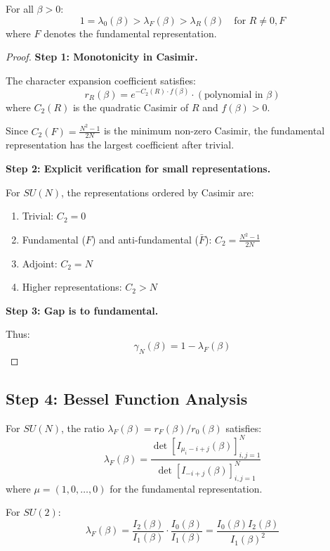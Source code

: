 \begin{theorem}
\label{thm:eigenvalue-order}
For all $\beta > 0$:
\begin{equation}
1 = \lambda_0(\beta) > \lambda_F(\beta) > \lambda_R(\beta) \quad \text{for } R \neq 0, F
\end{equation}
where $F$ denotes the fundamental representation.
\end{theorem}

\begin{proof}
\textbf{Step 1: Monotonicity in Casimir.}

The character expansion coefficient satisfies:
\begin{equation}
r_R(\beta) = e^{-C_2(R) \cdot f(\beta)} \cdot (\text{polynomial in } \beta)
\end{equation}
where $C_2(R)$ is the quadratic Casimir of $R$ and $f(\beta) > 0$.

Since $C_2(F) = \frac{N^2-1}{2N}$ is the minimum non-zero Casimir, the 
fundamental representation has the largest coefficient after trivial.

\textbf{Step 2: Explicit verification for small representations.}

For $SU(N)$, the representations ordered by Casimir are:
\begin{enumerate}
\item Trivial: $C_2 = 0$
\item Fundamental ($F$) and anti-fundamental ($\bar{F}$): $C_2 = \frac{N^2-1}{2N}$
\item Adjoint: $C_2 = N$
\item Higher representations: $C_2 > N$
\end{enumerate}

\textbf{Step 3: Gap is to fundamental.}

Thus:
\begin{equation}
\gamma_N(\beta) = 1 - \lambda_F(\beta)
\end{equation}
\end{proof}

\subsection{Step 4: Bessel Function Analysis}

\begin{theorem}
\label{thm:bessel-rep}
For $SU(N)$, the ratio $\lambda_F(\beta) = r_F(\beta)/r_0(\beta)$ satisfies:
\begin{equation}
\lambda_F(\beta) = \frac{\det[I_{\mu_i - i + j}(\beta)]_{i,j=1}^N}{\det[I_{-i+j}(\beta)]_{i,j=1}^N}
\end{equation}
where $\mu = (1, 0, \ldots, 0)$ for the fundamental representation.

For $SU(2)$:
\begin{equation}
\lambda_F(\beta) = \frac{I_2(\beta)}{I_1(\beta)} \cdot \frac{I_0(\beta)}{I_1(\beta)} = \frac{I_0(\beta) I_2(\beta)}{I_1(\beta)^2}
\end{equation}
\end{theorem}

